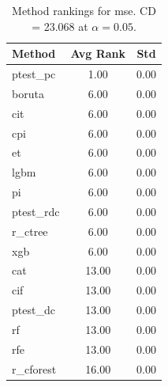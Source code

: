 \begin{table}[h]
\centering
\caption{Method rankings for mse. CD = 23.068 at $\alpha=0.05$.}
\label{tab:ranks_mse}
\begin{tabular}{lcc}
\toprule
Method & Avg Rank & Std \\
\midrule
ptest_pc & 1.00 & 0.00 \\
boruta & 6.00 & 0.00 \\
cit & 6.00 & 0.00 \\
cpi & 6.00 & 0.00 \\
et & 6.00 & 0.00 \\
lgbm & 6.00 & 0.00 \\
pi & 6.00 & 0.00 \\
ptest_rdc & 6.00 & 0.00 \\
r_ctree & 6.00 & 0.00 \\
xgb & 6.00 & 0.00 \\
cat & 13.00 & 0.00 \\
cif & 13.00 & 0.00 \\
ptest_dc & 13.00 & 0.00 \\
rf & 13.00 & 0.00 \\
rfe & 13.00 & 0.00 \\
r_cforest & 16.00 & 0.00 \\
\bottomrule
\end{tabular}
\end{table}
